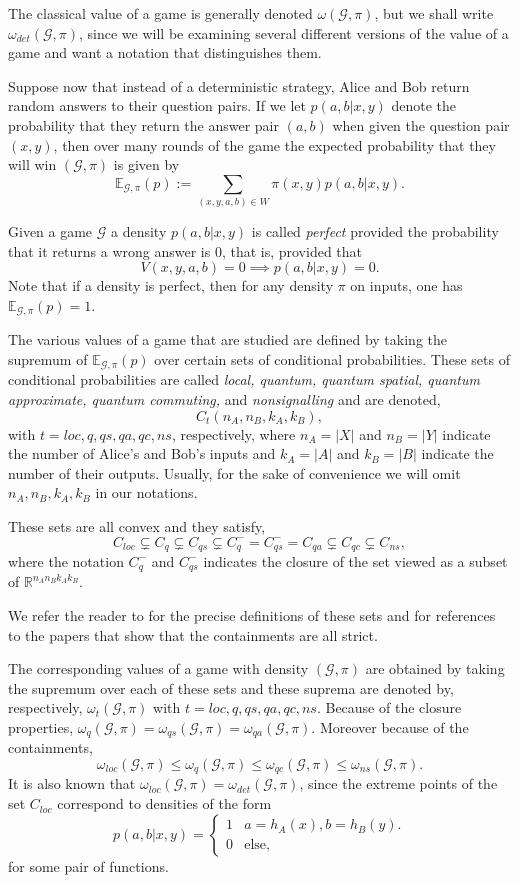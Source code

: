 \documentclass[11pt]{amsart}
\theoremstyle{definition}
\newcommand{\bb}[1]{\mathbb{#1}}
\newcommand{\cl}[1]{\mathcal{#1}}
\begin{document}
 The classical value of a game is generally denoted $\omega(\cl G, \pi)$, but we shall write $\omega_{det}(\cl G, \pi)$, since we will be examining several different versions of the value of a game and want a notation that distinguishes them.

Suppose now that instead of a deterministic strategy, Alice and Bob return random answers to their question pairs. If we let
$p(a,b|x,y)$ denote the probability that they return the answer pair $(a,b)$ when given the question pair $(x,y)$, then over many rounds of the game the expected probability that they will win $(\cl G, \pi)$ is given by
\[ \bb E_{\cl G, \pi}(p) := \sum_{(x,y,a,b) \in W} \pi(x,y) p(a,b|x,y).\]

Given a game $\cl G$ a density $p(a,b|x,y)$ is called {\it perfect} provided the probability that it returns a wrong answer is 0, that is, provided that
\[ V(x,y,a,b) =0 \implies p(a,b|x,y) =0.\]
Note that if a density is perfect, then for any density $\pi$ on inputs, one has $\bb E_{\cl G, \pi}(p) =1.$

The various values of a game that are studied are defined by taking the supremum of $\bb E_{\cl G, \pi}(p)$ over certain sets of conditional probabilities.  These sets of conditional probabilities are called {\it local, quantum, quantum spatial, quantum approximate, quantum commuting,} and {\it nonsignalling} and are denoted,
\[ C_t(n_A, n_B, k_A, k_B),\]
with $t = loc, q, qs, qa, qc, ns$, respectively, where $n_A=|X|$ and $n_B=|Y|$ indicate the number of Alice's and Bob's inputs and $k_A=|A|$ and $k_B=|B|$ indicate the number of their outputs.
Usually, for the sake of convenience we will omit $n_A, n_B, k_A, k_B$ in our notations.

These sets are all convex and they satisfy,
\[ C_{loc} \subsetneq C_q \subsetneq C_{qs} \subsetneq C_q^-= C_{qs}^- = C_{qa} \subsetneq C_{qc} \subsetneq C_{ns},\]
where the notation $C_q^-$ and $C_{qs}^-$ indicates the closure of the set viewed as a subset of $\bb R^{n_An_Bk_Ak_B}$.

We refer the reader to \cite{HMNPR, HP} for the precise definitions of these sets and for references to the papers that show that the containments are all strict.

The corresponding values of a game with density $(\cl G, \pi)$ are obtained by taking the supremum over each of these sets and these suprema are denoted by, respectively, $\omega_t(\cl G, \pi)$ with $t= loc, q, qs, qa, qc, ns$.
Because of the closure properties,  $\omega_q(\cl G, \pi) = \omega_{qs}(\cl G, \pi) = \omega_{qa}(\cl G, \pi)$. Moreover because of the containments,
\[ \omega_{loc}(\cl G, \pi) \le \omega_q(\cl G, \pi) \le \omega_{qc}(\cl G, \pi) \le \omega_{ns}(\cl G, \pi).\]
It is also known that $\omega_{loc}(\cl G, \pi) = \omega_{det}(\cl G, \pi)$, since the extreme points of the set $C_{loc}$ correspond to densities of the form
\[ p(a,b|x,y) = \begin{cases} 1 & a=h_A(x), b= h_B(y).\\ 0 & \text{else}, \end{cases} \]
for some pair of functions.
\end{document}
